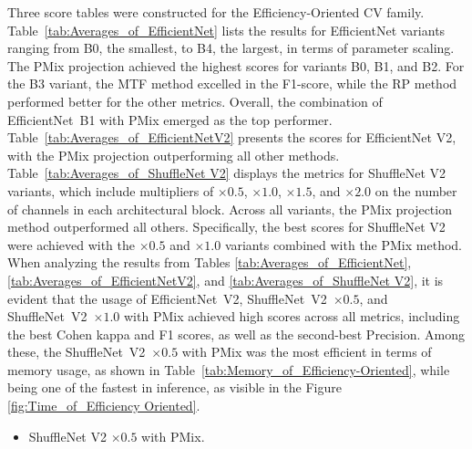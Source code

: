 Three score tables were constructed for the Efficiency-Oriented \gls{CV} family.
Table~\ref{tab:Averages_of_EfficientNet} lists the results for EfficientNet variants ranging from B0, the smallest, to B4, the largest, in terms of parameter scaling. The \gls{PMix} projection achieved the highest scores for variants B0, B1, and B2. For the B3 variant, the \gls{MTF} method excelled in the F1-score, while the \gls{RP} method performed better for the other metrics. Overall, the combination of \mbox{EfficientNet B1} with \gls{PMix} emerged as the top performer.
Table~\ref{tab:Averages_of_EfficientNetV2} presents the scores for EfficientNet V2, with the \gls{PMix} projection outperforming all other methods.
Table~\ref{tab:Averages_of_ShuffleNet V2} displays the metrics for ShuffleNet V2 variants, which include multipliers of $\times 0.5$, $\times 1.0$, $\times 1.5$, and $\times 2.0$ on the number of channels in each architectural block. Across all variants, the \gls{PMix} projection method outperformed all others. Specifically, the best scores for ShuffleNet V2 were achieved with the $\times 0.5$ and $\times 1.0$ variants combined with the \gls{PMix} method.
When analyzing the results from Tables  \ref{tab:Averages_of_EfficientNet}, \ref{tab:Averages_of_EfficientNetV2}, and \ref{tab:Averages_of_ShuffleNet V2}, it is evident that the usage of \mbox{EfficientNet V2}, \mbox{ShuffleNet V2 $\times 0.5$}, and \mbox{ShuffleNet V2 $\times 1.0$}  with \gls{PMix} achieved high scores across all metrics, including the best Cohen kappa and F1 scores, as well as the second-best Precision. Among these, the \mbox{ShuffleNet V2 $\times 0.5$} with \gls{PMix} was the most efficient in terms of memory usage, as shown in Table~\ref{tab:Memory_of_Efficiency-Oriented}, while being one of the fastest in inference, as visible in the Figure \ref{fig:Time_of_Efficiency Oriented}.  
\begin{itemize}
	\item ShuffleNet V2 $\times 0.5$ with \gls{PMix}.
\end{itemize}



